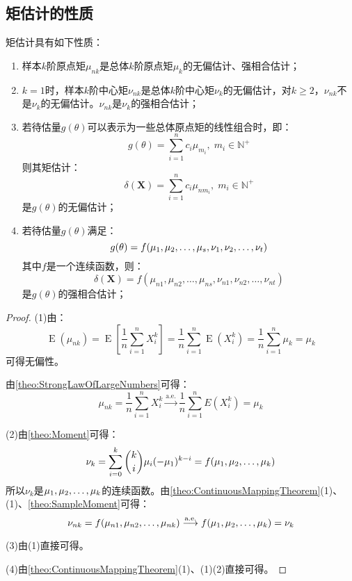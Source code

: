 \subsection{矩估计的性质}
\begin{property}
	矩估计具有如下性质：
	\begin{enumerate}
		\item 样本$k$阶原点矩$\mu_{nk}$是总体$k$阶原点矩$\mu_k$的无偏估计、强相合估计；
		\item $k=1$时，样本$k$阶中心矩$\nu_{nk}$是总体$k$阶中心矩$\nu_k$的无偏估计，对$k\geqslant2$，$\nu_{nk}$不是$\nu_k$的无偏估计。$\nu_{nk}$是$\nu_k$的强相合估计；
		\item 若待估量$g(\theta)$可以表示为一些总体原点矩的线性组合时，即：
		\begin{equation*}
			g(\theta)=\sum_{i=1}^{n}c_i\mu_{m_i},\;m_i\in\mathbb{N}^+
		\end{equation*}
		则其矩估计：
		\begin{equation*}
			\delta(\mathbf{X})=\sum_{i=1}^{n}c_i\mu_{nm_i},\;m_i\in\mathbb{N}^+
		\end{equation*}
		是$g(\theta)$的无偏估计；
		\item 若待估量$g(\theta)$满足：
		\begin{equation*}
			g(\theta)=f(\mu_1, \mu_2, \dots, \mu_{s},\nu_1, \nu_2, \dots, \nu_{t})
		\end{equation*}
		其中$f$是一个连续函数，则：
		\begin{equation*}
			\delta(\mathbf{X})=f(\mu_{n1},\mu_{n2},\dots,\mu_{ns},\nu_{n1},\nu_{n2},\dots,\nu_{nt})
		\end{equation*}
		是$g(\theta)$的强相合估计；
	\end{enumerate}
\end{property}
\begin{proof}
	(1)由：
	\begin{equation*}
		\operatorname{E}(\mu_{nk})=\operatorname{E}\left[\frac{1}{n}\sum_{i=1}^{n}X_i^k\right]=\frac{1}{n}\sum_{i=1}^{n}\operatorname{E}(X_i^k)=\frac{1}{n}\sum_{i=1}^{n}\mu_k=\mu_k
	\end{equation*}
	可得无偏性。\par
	由\cref{theo:StrongLawOfLargeNumbers}可得：
	\begin{equation*}
		\mu_{nk}=\frac{1}{n}\sum_{i=1}^{n}X_i^k\overset{\text{a.e.}}{\longrightarrow}\frac{1}{n}\sum_{i=1}^{n}E(X_i^k)=\mu_k
	\end{equation*}\par
	(2)由\cref{theo:Moment}可得：
	\begin{equation*}
		\nu_k=\sum_{i=0}^{k}\binom{k}{i}\mu_i(-\mu_1)^{k-i}=f(\mu_1, \mu_2, \dots, \mu_{k})
	\end{equation*}
	所以$\nu_k$是$\mu_1, \mu_2, \dots, \mu_{k}$的连续函数。由\cref{theo:ContinuousMappingTheorem}(1)、(1)、\cref{theo:SampleMoment}可得：
	\begin{equation*}
		\nu_{nk}=f(\mu_{n1},\mu_{n2},\dots,\mu_{nk})\overset{\text{a.e.}}{\longrightarrow}f(\mu_1, \mu_2, \dots, \mu_{k})=\nu_{k}
	\end{equation*}\par
	(3)由(1)直接可得。\par
	(4)由\cref{theo:ContinuousMappingTheorem}(1)、(1)(2)直接可得。
\end{proof}